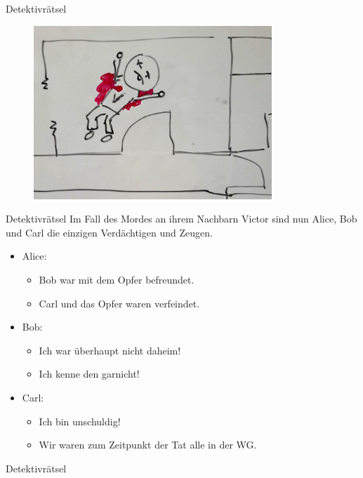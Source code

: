\documentclass{beamer}
\newcommand{\code}[1]{
	\begin{mdframed}
		
	\end{mdframed}
}
\begin{document}
\begin{frame}{Detektivrätsel}
	\begin{figure}
		\includegraphics[width=0.8\textwidth]{images/victor}
	\end{figure}
\end{frame}

\begin{frame}{Detektivrätsel}
	Im Fall des Mordes an ihrem Nachbarn Victor sind nun Alice, Bob und Carl die einzigen Verdächtigen und Zeugen.
	\begin{itemize}
		\item Alice:
		\begin{itemize}
			\item Bob war mit dem Opfer befreundet.
			\item Carl und das Opfer waren verfeindet.
		\end{itemize}
		\item Bob:
		\begin{itemize}
			\item Ich war überhaupt nicht daheim!
			\item Ich kenne den garnicht!
		\end{itemize}
		\item Carl:
		\begin{itemize}
			\item Ich bin unschuldig!
			\item Wir waren zum Zeitpunkt der Tat alle in der WG.
		\end{itemize}
	\end{itemize}
\end{frame}

\begin{frame}{Detektivrätsel}
	\code{demos/detektiv.pl}
\end{frame}
\end{document}
